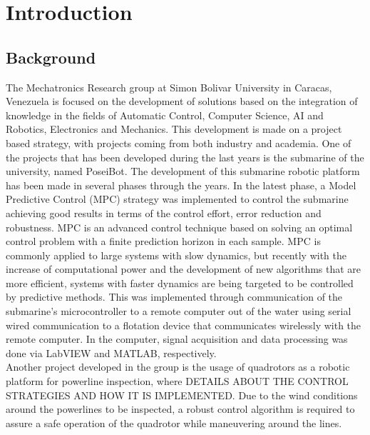 \chapter{Introduction}
\label{chap:Introduction}
%
%
%
%

\section{Background}

The Mechatronics Research group at Simon Bolivar University in Caracas, Venezuela is focused on the development of solutions based on the integration of knowledge in the fields of Automatic Control, Computer Science, AI and Robotics, Electronics and Mechanics. This development is made on a project based strategy, with projects coming from both industry and academia. One of the projects that has been developed during the last years is the submarine of the university, named PoseiBot. The development of this submarine robotic platform has been made in several phases through the years. In the latest phase, a Model Predictive Control (MPC) strategy was implemented to control the submarine achieving good results in terms of the control effort, error reduction and robustness. MPC is an advanced control technique based on solving an optimal control problem with a finite prediction horizon in each sample. MPC is commonly applied to large systems with slow dynamics, but recently with the increase of computational power and the development of new algorithms that are more efficient, systems with faster dynamics are being targeted to be controlled by predictive methods. This was implemented through communication of the submarine's microcontroller to a remote computer out of the water using serial wired communication to a flotation device that communicates wirelessly with the remote computer. In the computer, signal acquisition  and data processing was done via LabVIEW \texttrademark  and MATLAB\textsuperscript{\textregistered}, respectively. \\

Another project developed in the group is the usage of quadrotors as a robotic platform for powerline inspection, where DETAILS ABOUT THE CONTROL STRATEGIES AND HOW IT IS IMPLEMENTED. Due to the wind conditions around the powerlines to be inspected, a robust control algorithm is required to assure a safe operation of the quadrotor while maneuvering around the lines.\\

